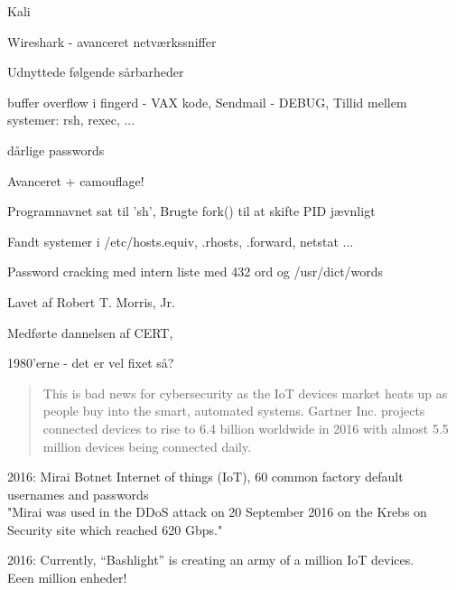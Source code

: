\documentclass[20pt,landscape,a4paper]{foils}
\begin{document}


\begin{list1}
\item Kali 
\item Wireshark -  avanceret netværkssniffer
\end{list1}






\begin{list1}
\item Udnyttede følgende sårbarheder
\begin{list2}
\item buffer overflow i fingerd - VAX kode, Sendmail - DEBUG, Tillid mellem systemer: rsh, rexec, ...
\item dårlige passwords
\end{list2}
\item Avanceret + camouflage!
\begin{list2}
\item Programnavnet sat til 'sh', Brugte fork() til at skifte PID jævnligt
\item Fandt systemer i /etc/hosts.equiv, .rhosts, .forward, netstat ...
\item Password cracking med intern liste med 432 ord og /usr/dict/words
\end{list2}
\item Lavet af Robert T. Morris, Jr.
\item Medførte dannelsen af CERT, 
\end{list1}

\centerline{1980'erne - det er vel fixet så?}



\begin{quote}
  This is bad news for cybersecurity as the IoT devices market heats up as people buy into the smart, automated systems. Gartner Inc. projects connected devices to rise to 6.4 billion worldwide in 2016 with almost 5.5 million devices being connected daily.
\end{quote}

\begin{list1}
\item 2016: Mirai Botnet Internet of things (IoT), 60 common factory default usernames and passwords\\
"Mirai was used in the DDoS attack on 20 September 2016 on the Krebs on Security site which reached 620 Gbps."

\item 2016: Currently, “Bashlight” is creating an army of a million IoT devices.\\
Eeen million enheder!

\end{list1}
\end{document}
